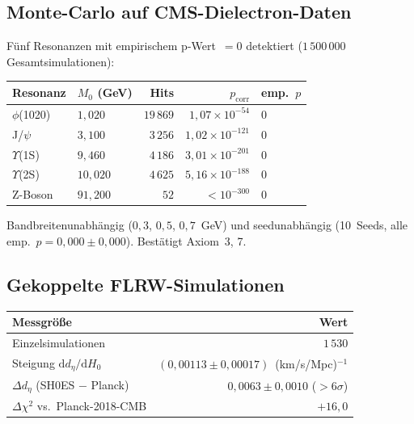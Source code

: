 \documentclass[a4paper,11pt]{article}
\begin{document}
	\subsection{Monte-Carlo auf CMS-Dielectron-Daten}
	
	F\"unf Resonanzen mit empirischem p-Wert~$= 0$ detektiert
	($1\,500\,000$ Gesamtsimulationen):
	
	\begin{center}
		\begin{tabular}{llrrl}
			\hline
			\textbf{Resonanz} & $M_0$ (GeV)
			& \textbf{Hits} & $p_{\mathrm{corr}}$
			& \textbf{emp.\ $p$} \\
			\hline
			$\phi$(1020) & $1{,}020$ & $19\,869$
			& $1{,}07 \times 10^{-54}$ & $0$ \\
			J/$\psi$ & $3{,}100$ & $3\,256$
			& $1{,}02 \times 10^{-121}$ & $0$ \\
			$\Upsilon$(1S) & $9{,}460$ & $4\,186$
			& $3{,}01 \times 10^{-201}$ & $0$ \\
			$\Upsilon$(2S) & $10{,}020$ & $4\,625$
			& $5{,}16 \times 10^{-188}$ & $0$ \\
			Z-Boson & $91{,}200$ & $52$
			& $< 10^{-300}$ & $0$ \\
			\hline
		\end{tabular}
	\end{center}
	
	Bandbreitenunabh\"angig ($0{,}3$, $0{,}5$,
	$0{,}7$~GeV) und seedunabh\"angig
	(10~Seeds, alle emp.\ $p = 0{,}000 \pm 0{,}000$).
	Best\"atigt Axiom~3, 7.
	
	\subsection{Gekoppelte FLRW-Simulationen}
	
	\begin{center}
		\begin{tabular}{lr}
			\hline
			\textbf{Messgr\"o\ss{}e} & \textbf{Wert} \\
			\hline
			Einzelsimulationen & $1\,530$ \\
			Steigung $\mathrm{d}d_\eta / \mathrm{d}H_0$
			& $(0{,}00113 \pm 0{,}00017)$~(km/s/Mpc)$^{-1}$ \\
			$\Delta d_\eta$ (SH0ES $-$ Planck)
			& $0{,}0063 \pm 0{,}0010$ ($>6\sigma$) \\
			$\Delta\chi^2$ vs.\ Planck-2018-CMB
			& $+16{,}0$ \\
			\hline
		\end{tabular}
	\end{center}
	
\end{document}

